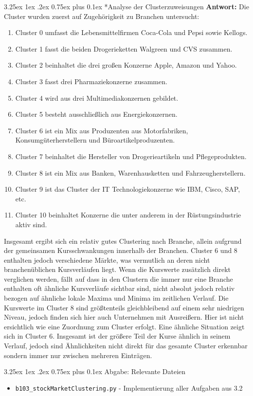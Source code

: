 \documentclass[12pt,a4paper]{scrartcl}
\makeatletter
\renewcommand\subparagraph{\@startsection{subparagraph}{5}{\parindent}%
    {3.25ex \@plus1ex \@minus .2ex}%
    {0.75ex plus 0.1ex}%
    {\normalfont\normalsize\bfseries}}
\makeatother
\begin{document}
\subparagraph*{Analyse der Clusterzuweisungen}
\textbf{Antwort:} 
Die Cluster wurden zuerst auf Zugehörigkeit zu Branchen untersucht:

\begin{enumerate}
\item Cluster 0 umfasst die Lebensmittelfirmen Coca-Cola und Pepsi sowie Kellogs.
\item Cluster 1 fasst die beiden Drogerieketten Walgreen und CVS zusammen. 
\item Cluster 2 beinhaltet die drei großen Konzerne Apple, Amazon und Yahoo.
\item Cluster 3 fasst drei Pharmaziekonzerne zusammen. 
\item Cluster 4 wird aus drei Multimediakonzernen gebildet.
\item Cluster 5 besteht ausschließlich aus Energiekonzernen.
\item Cluster 6 ist ein Mix aus Produzenten aus Motorfabriken, Konsumgüterherstellern und Büroartikelproduzenten.
\item Cluster 7 beinhaltet die Hersteller von Drogerieartikeln und Pflegeprodukten.
\item Cluster 8 ist ein Mix aus Banken, Warenhausketten und Fahrzeugherstellern.
\item Cluster 9 ist das Cluster der IT Technologiekonzerne wie IBM, Cisco, SAP, etc.
\item Cluster 10 beinhaltet Konzerne die unter anderem in der Rüstungsindustrie aktiv sind.
\end{enumerate}

Insgesamt ergibt sich ein relativ gutes Clustering nach Branche, allein aufgrund
der gemeinsamen Kursschwankungen innerhalb der Branchen. Cluster 6 und 8 enthalten jedoch
verschiedene Märkte, was vermutlich an deren nicht branchenüblichen Kursverläufen liegt. 
Wenn die Kurswerte zusätzlich direkt verglichen werden, fällt auf dass in den Clustern die immer
nur eine Branche enthalten oft ähnliche Kursverläufe sichtbar sind, nicht absolut jedoch relativ
bezogen auf ähnliche lokale Maxima und Minima im zeitlichen Verlauf. 
Die Kurswerte im Cluster 8 sind größtenteils gleichbleibend auf einem sehr niedrigen Niveau,
jedoch finden sich hier auch Unternehmen mit Ausreißern. Hier ist nicht ersichtlich wie eine
Zuordnung zum Cluster erfolgt.
Eine ähnliche Situation zeigt sich in Cluster 6. Insgesamt ist der größere Teil der Kurse
ähnlich in seinem Verlauf, jedoch sind Ähnlichkeiten nicht direkt für das gesamte Cluster
erkennbar sondern immer nur zwischen mehreren Einträgen.

\subparagraph{Abgabe: Relevante Dateien}
\begin{itemize}
\item \lstinline{b103_stockMarketClustering.py} - Implementierung aller Aufgaben aus 3.2
\end{itemize}
\end{document}
